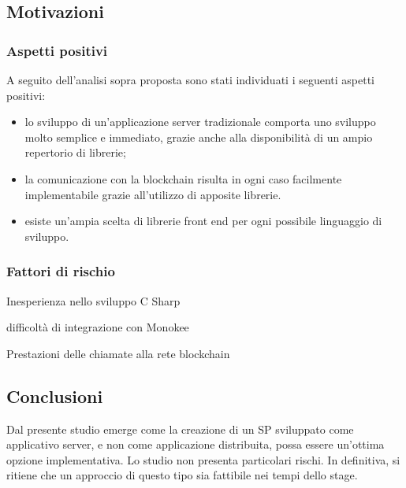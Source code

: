 \subsection{Motivazioni}
\subsubsection{Aspetti positivi}
A seguito dell’analisi sopra proposta sono stati individuati i seguenti aspetti positivi:
\begin{itemize}
    \item lo sviluppo di un’applicazione server tradizionale comporta uno sviluppo molto semplice e immediato, grazie anche alla disponibilità di un ampio repertorio di librerie;
    \item la comunicazione con la blockchain risulta in ogni caso facilmente implementabile grazie all’utilizzo di apposite librerie.
    \item esiste un’ampia scelta di librerie front end per ogni possibile linguaggio di sviluppo.
\end{itemize}
    
\subsubsection{Fattori di rischio}
\begin{risk}{Inesperienza nello sviluppo C Sharp}
    \label{risk:centralization-vision-from-user} 
\end{risk}
\begin{risk}{difficoltà di integrazione con Monokee}
    \label{risk:centralization-vision-from-user} 
\end{risk}
\begin{risk}{Prestazioni delle chiamate alla rete blockchain}
    \label{risk:centralization-vision-from-user} 
\end{risk}
\subsection{Conclusioni}
Dal presente studio emerge come la creazione di un SP sviluppato come applicativo server, e non come applicazione distribuita, possa essere un’ottima opzione implementativa. Lo studio non presenta particolari rischi. In definitiva, si ritiene che un approccio di questo tipo sia fattibile nei tempi dello stage.

